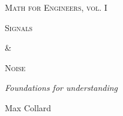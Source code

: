 \documentclass[11pt,letterpaper]{book}
\theoremstyle{plain}
\theoremstyle{definition}
\theoremstyle{remark}
\begin{document}
\frontmatter

\begin{titlepage}

    \centering
    {\scshape\Large Math for Engineers, vol. I \par}
    \vspace{4.0cm}
    {\scshape\huge Signals \par}
    \vspace{0.4cm}
    {\scshape\huge \& \par}
    \vspace{0.4cm}
    {\scshape\huge Noise \par}
    \vspace{1.0cm}
    {\Large\itshape Foundations for understanding \par}
    \vspace{6.0cm}
    {\Large Max Collard \par}

    \vfill

\end{titlepage}

\tableofcontents


\mainmatter






\backmatter

\end{document}
